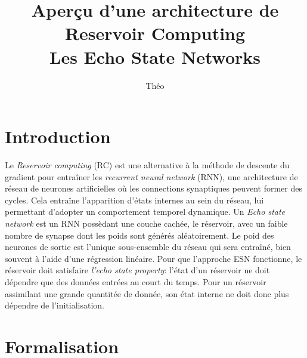 \documentclass[12pt]{article}
\title{Aperçu d'une architecture de Reservoir Computing\\Les Echo State Networks}
\author{Théo \bsc{Biasutto--Lervat}}
\date{}
\begin{document}
\maketitle

\section{Introduction}

Le \textit{Reservoir computing} (RC) est une alternative à la méthode de descente du gradient pour entraîner les \textit{recurrent neural network} (RNN), une architecture de réseau de neurones artificielles où les connections synaptiques peuvent former des cycles. Cela entraîne l'apparition d'états internes au sein du réseau, lui permettant d'adopter un comportement temporel dynamique.\newline
Un \textit{Echo state network} est un RNN possèdant une couche cachée, le réservoir, avec un faible nombre de synapse dont les poids sont générés aléatoirement. Le poid des neurones de sortie est l'unique sous-ensemble du réseau qui sera entraîné, bien souvent à l'aide d'une régression linéaire.\newline
Pour que l'approche ESN fonctionne, le réservoir doit satisfaire \textit{l'echo state property}: l'état d'un réservoir ne doit dépendre que des données entrées au court du temps. Pour un réservoir assimilant une grande quantitée de donnée, son état interne ne doit donc plus dépendre de l'initialisation.


\section{Formalisation}
\end{document}
